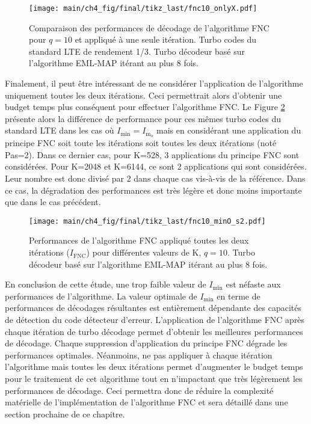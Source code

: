 \begin{figure}[!h]
	\centering 
	\hspace*{-.075\textwidth}
	\texttt{[image: main/ch4\_fig/final/tikz\_last/fnc10\_onlyX.pdf]}
	\caption{Comparaison des performances de décodage de l'algorithme FNC pour $q=10$ et appliqué à une seule itération. 
	Turbo codes du standard LTE de rendement 1/3. 
	Turbo décodeur basé sur l'algorithme EML-MAP itérant au plus 8 fois.
	\label{fig:fnc_onlyX}}
\end{figure}

Finalement, il peut être intéressant de ne considérer l'application de l'algorithme uniquement toutes les deux 
itérations. Ceci permettrait alors d'obtenir une budget temps plus conséquent pour effectuer l'algorithme FNC. Le Figure 
\ref{fig:fnc_step} présente alors la différence de performance pour ces mêmes turbo codes du standard LTE dans les cas
où $I_\text{min} = I_{\text{m}_\text{o}}$ mais en considérant une application du principe FNC soit toute les itérations 
soit toutes les deux itérations (noté Pas=2). Dans ce dernier cas, pour K=528, 3 applications du principe FNC sont 
considérées. Pour K=2048 et K=6144, ce sont 2 applications qui sont considérées. Leur nombre est donc divisé par 2 dans 
chaque cas vis-à-vis de la référence. Dans ce cas, la dégradation des performances est très légère et donc moins 
importante que dans le cas précédent.

\begin{figure}[!h]
	\centering
	\texttt{[image: main/ch4\_fig/final/tikz\_last/fnc10\_minO\_s2.pdf]}
	\caption{Performances de l'algorithme FNC appliqué toutes les deux itérations ($I_\text{FNC}$) pour différentes 
	valeurs de K, $q=10$.
	Turbo décodeur basé sur l'algorithme EML-MAP itérant au plus 8 fois.
	\label{fig:fnc_step}}
\end{figure}

En conclusion de cette étude, une trop faible valeur de $I_\text{min}$ est néfaste aux performances de l'algorithme. 
La valeur optimale de $I_\text{min}$ en terme de performances de décodages résultantes est entièrement dépendante des
capacités de détection du code détecteur d'erreur. L'application de l'algorithme FNC après chaque itération de turbo 
décodage permet d'obtenir les meilleures performances de décodage. Chaque suppression d'application du principe FNC 
dégrade les performances optimales. Néanmoins, ne pas appliquer à chaque itération l'algorithme mais toutes les deux 
itérations permet d'augmenter le budget temps pour le traitement de cet algorithme tout en n'impactant que très légèrement 
les performances de décodage. Ceci permettra donc de réduire la complexité matérielle de 
l'implémentation de l'algorithme FNC et sera détaillé dans une section prochaine de ce chapitre.

